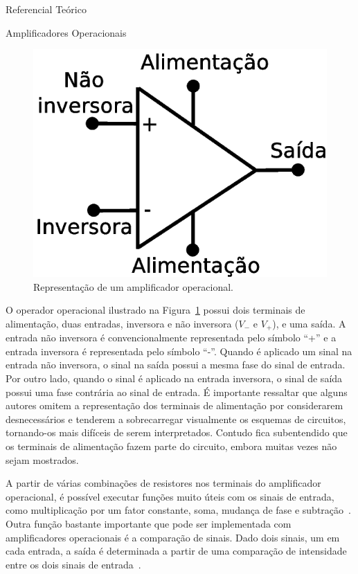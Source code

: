 \begin{chapter}{Referencial Teórico}
\begin{section}{Amplificadores Operacionais}
\begin{figure}[!h]
	\centering
	\begin{minipage}[c]{\textwidth}
	\centering
	\includegraphics[width=0.55\linewidth]{fig/opamp}
	\caption{Representação de um amplificador operacional.}
	\label{fig:opamp}
	\end{minipage}
\end{figure}

O operador operacional ilustrado na Figura~\ref{fig:opamp} possui dois terminais
de alimentação, duas entradas, inversora e não inversora ($V_{-}$ e $V_{+}$), e
uma saída. A entrada não inversora é convencionalmente representada pelo símbolo
``+'' e a entrada inversora é representada pelo símbolo ``-''. Quando é aplicado
um sinal na entrada não inversora, o sinal na saída possui a mesma fase do sinal
de entrada. Por outro lado, quando o sinal é aplicado na entrada inversora, o
sinal de saída possui uma fase contrária ao sinal de entrada. É importante
ressaltar que alguns autores omitem a representação dos terminais de alimentação
por considerarem desnecessários e tenderem a sobrecarregar visualmente os
esquemas de circuitos, tornando-os mais difíceis de serem interpretados. Contudo
fica subentendido que os terminais de alimentação fazem parte do circuito,
embora muitas vezes não sejam mostrados.

A partir de várias combinações de resistores nos terminais do amplificador
operacional, é possível executar funções muito úteis com os sinais de entrada, 
como multiplicação por um fator constante, soma, mudança de fase e
subtração~\cite{Nilson09}. Outra função bastante importante que pode ser
implementada com amplificadores operacionais é a comparação de sinais. Dado dois
sinais, um em cada entrada, a saída é determinada a partir de uma comparação de
intensidade entre os dois sinais de entrada~\cite{Terrell96}.  
 


\end{section}
\end{chapter}
